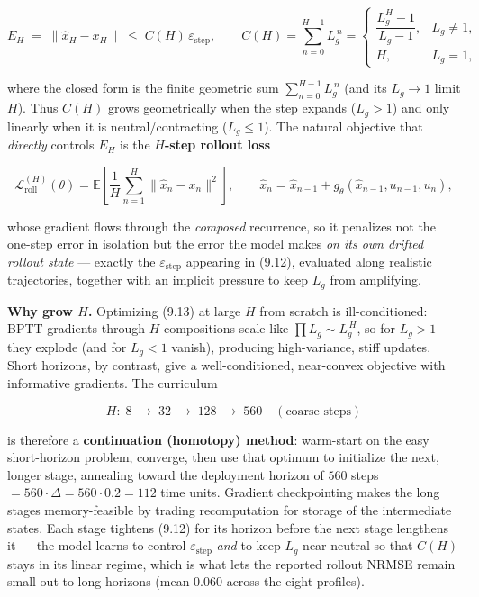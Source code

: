 \documentclass[
  11pt,
]{article}
\providecommand{\lt}{<}
\providecommand{\gt}{>}
\begin{document}
\[
E_H \;=\; \big\lVert \hat{x}_H-x_H\big\rVert \;\le\; C(H)\,\varepsilon_{\text{step}},
\qquad
C(H)=\sum_{n=0}^{H-1}L_g^{\,n}=
\begin{cases}\dfrac{L_g^{H}-1}{L_g-1}, & L_g\neq 1,\\[4pt] H, & L_g=1,\end{cases}
\tag{9.12}
\]

where the closed form is the finite geometric sum
\(\sum_{n=0}^{H-1}L_g^{\,n}\) (and its \(L_g\to1\) limit \(H\)). Thus
\(C(H)\) grows geometrically when the step expands (\(L_g\gt 1\)) and
only linearly when it is neutral/contracting (\(L_g\le1\)). The natural
objective that \emph{directly} controls \(E_H\) is the
\textbf{\(H\)-step rollout loss}

\[
\mathcal{L}^{(H)}_{\text{roll}}(\theta)
=\mathbb{E}\!\left[\frac{1}{H}\sum_{n=1}^{H}\big\lVert \hat{x}_n-x_n\big\rVert^{2}\right],
\qquad \hat{x}_n=\hat{x}_{n-1}+g_\theta(\hat{x}_{n-1},u_{n-1},u_n),
\tag{9.13}
\]

whose gradient flows through the \emph{composed} recurrence, so it
penalizes not the one-step error in isolation but the error the model
makes \emph{on its own drifted rollout state} --- exactly the
\(\varepsilon_{\text{step}}\) appearing in (9.12), evaluated along
realistic trajectories, together with an implicit pressure to keep
\(L_g\) from amplifying.

\textbf{Why grow \(H\).} Optimizing (9.13) at large \(H\) from scratch
is ill-conditioned: BPTT gradients through \(H\) compositions scale like
\(\prod L_g\sim L_g^{\,H}\), so for \(L_g\gt 1\) they explode (and for
\(L_g\lt 1\) vanish), producing high-variance, stiff updates. Short
horizons, by contrast, give a well-conditioned, near-convex objective
with informative gradients. The curriculum

\[
H:\; 8\;\to\;32\;\to\;128\;\to\;560\quad(\text{coarse steps})
\]

is therefore a \textbf{continuation (homotopy) method}: warm-start on
the easy short-horizon problem, converge, then use that optimum to
initialize the next, longer stage, annealing toward the deployment
horizon of \(560\) steps \(=560\cdot\Delta=560\cdot0.2=112\) time units.
Gradient checkpointing makes the long stages memory-feasible by trading
recomputation for storage of the intermediate states. Each stage
tightens (9.12) for its horizon before the next stage lengthens it ---
the model learns to control \(\varepsilon_{\text{step}}\) \emph{and} to
keep \(L_g\) near-neutral so that \(C(H)\) stays in its linear regime,
which is what lets the reported rollout NRMSE remain small out to long
horizons (mean \(0.060\) across the eight profiles).
\end{document}
